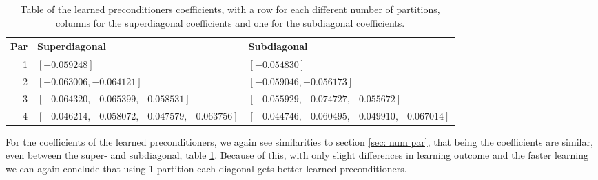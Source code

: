 \begin{table}[H]
    \center        
    \begin{tabular}{|r|ll|}
        \hline
        Par & Superdiagonal & Subdiagonal \\ \hline
        1 & \([-0.059248]\) & \([-0.054830]\) \\
        2 & \([-0.063006, -0.064121]\) & \([-0.059046, -0.056173]\) \\ 
        3 & \([-0.064320, -0.065399, -0.058531]\) & \([-0.055929, -0.074727, -0.055672]\) \\
        4 & \([-0.046214, -0.058072, -0.047579, -0.063756]\) & \([-0.044746, -0.060495, -0.049910, -0.067014]\) \\\hline
    \end{tabular}
    \caption{Table of the learned preconditioners coefficients, with a row for each different number of partitions, columns for the superdiagonal coefficients and one for the subdiagonal coefficients.}
    \label{table: par super sub coefficients}
\end{table}

For the coefficients of the learned preconditioners, we again see similarities to section \ref{sec: num par}, that being the coefficients are similar, even between the super- and subdiagonal, table \ref{table: par super sub coefficients}. Because of this, with only slight differences in learning outcome and the faster learning we can again conclude that using 1 partition each diagonal gets better learned preconditioners.